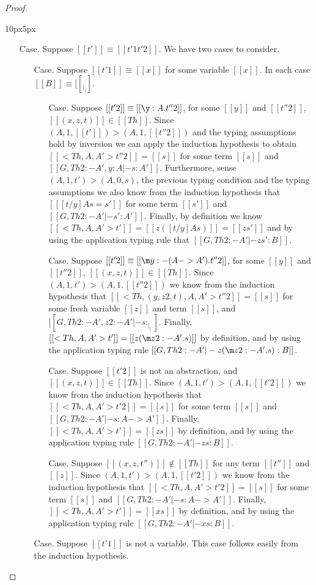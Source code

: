 \begin{proof}
\begin{changemargin}{10px}{5px}
\begin{itemize}
  \item[Case.] Suppose $[[t']] \equiv [[t'1 t'2]]$. We have two cases to consider.
    \begin{itemize}
    \item[Case.] Suppose $[[t'1]] \equiv [[x]]$ for some variable $[[x]]$.  In each
      case $[[B]] \equiv [[_|_]]$.
      \begin{itemize}
      \item[Case.] Suppose $[[t'2]] \equiv [[\y:A.t''2]]$, for some $[[y]]$ and $[[t''2]]$,
        $[[(x,z,t)]] \in [[Th]]$. Since 
        $(A,1,[[t']]) > (A,1,[[t''2]])$ and the typing assumptions
        hold by inversion we can apply the induction
        hypothesis to obtain $[[<Th,A,A'>t''2]] = [[s]]$ for some term $[[s]]$ and
        $[[G,Th 2:{-A'},y:A |- s : A']]$.
        Furthermore, sense $(A,1,t') > (A,0,s)$, the previous typing condition and
        the typing assumptions we also know from the induction hypothesis that 
        $[[ [t/y] A s = s' ]]$ for some term $[[s']]$ and
        $[[G,Th 2:{-A'} |- s' : A']]$. Finally, by definition we know 
        $[[<Th, A, A'>t']] = [[z ([t/y] A s)]] = [[z s']]$ and 
        by using the application typing rule that $[[G,Th 2:{-A'} |- z s' : B]]$.

      \item[Case.] Suppose $[[t'2]] \equiv [[\m y:{-(A->A')}.t''2]]$, for some $[[y]]$ and 
        $[[t''2]]$, $[[(x,z,t)]] \in [[Th]]$. Since $(A,1,t') > (A,1,[[t''2]])$ we know from the 
        induction hypothesis that $[[<Th,(y,z2,t),A,A'>t''2]] = [[s]]$ for some fresh variable $[[z]]$
        and term $[[s]]$, and $[[G,Th 2:{-A'},z2:{-A'} |- s : _|_ ]]$.
        Finally, $[[<Th, A,A'>t']] = [[z (\m z2:{-A'}.s)]]$ by definition, and by
        using the application typing rule 
        $[[G,Th 2:{-A'} |- z (\m z2:{-A'}.s) : B ]]$.

      \item[Case.] Suppose $[[t'2]]$ is not an abstraction, and $[[(x,z,t)]] \in [[Th]]$.  
        Since $(A,1,t') > (A,1,[[t'2]])$ we know from the 
        induction hypothesis that $[[<Th,A,A'>t'2]] = [[s]]$ for some term $[[s]]$
        and $[[G,Th 2:{-A'} |- s : A -> A' ]]$.  Finally,
        $[[<Th, A,A'>t']] = [[z s]]$ by definition, and by
        using the application typing rule 
        $[[G,Th 2:{-A'} |- z s : B ]]$.

      \item[Case.] Suppose $[[(x,z,t'')]] \not \in [[Th]]$ for any term $[[t'']]$ and $[[z]]$.  
        Since $(A,1,t') > (A,1,[[t'2]])$ we know from the 
        induction hypothesis that $[[<Th,A,A'>t'2]] = [[s]]$ for some term $[[s]]$
        and $[[G,Th 2:{-A'} |- s : A -> A' ]]$.  Finally,
        $[[<Th, A,A'>t']] = [[x s]]$ by definition, and by
        using the application typing rule 
        $[[G,Th 2:{-A'} |- x s : B ]]$.
      \end{itemize}
    \item[Case.] Suppose $[[t'1]]$ is not a variable.  This case follows easily from
      the induction hypothesis.
    \end{itemize}


\end{itemize}
\end{changemargin}
\end{proof}
